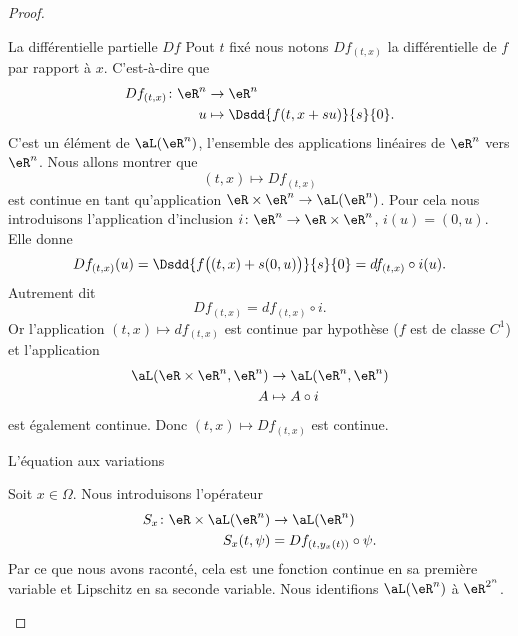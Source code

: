 \begin{proof}
	\begin{subproof}
		\item[La différentielle partielle \( Df\)]
		Pout \( t\) fixé nous notons \( Df_{(t,x)}\) la différentielle de \( f\) par rapport à \( x\). C'est-à-dire que
		\begin{equation}
			\begin{aligned}
				Df_{(t,x)}\colon \eR^n & \to \eR^n                         \\
				u                      & \mapsto \Dsdd{ f(t,x+su) }{s}{0}.
			\end{aligned}
		\end{equation}
		C'est un élément de \( \aL(\eR^n)\), l'ensemble des applications linéaires de \( \eR^n\) vers \( \eR^n\). Nous allons montrer que
		\begin{equation}
			(t,x)\mapsto Df_{(t,x)}
		\end{equation}
		est continue en tant qu'application \( \eR\times \eR^n\to\aL(\eR^n)\). Pour cela nous introduisons l'application d'inclusion \( i\colon \eR^n\to \eR\times \eR^n\), \( i(u)=(0,u)\). Elle donne
		\begin{equation}
			Df_{(t,x)}(u)=\Dsdd{ f\big( (t,x)+s(0,u) \big) }{s}{0}=df_{(t,x)}\circ i (u).
		\end{equation}
		Autrement dit
		\begin{equation}
			Df_{(t,x)}=df_{(t,x)}\circ i.
		\end{equation}
		Or l'application \( (t,x)\mapsto df_{(t,x)} \) est continue par hypothèse (\( f\) est de classe \( C^1\)) et l'application
		\begin{equation}        \label{EQooZTAPooCduWcl}
			\begin{aligned}
				\aL(\eR\times \eR^n,\eR^n) & \to \aL(\eR^n,\eR^n) \\
				A                          & \mapsto A\circ i
			\end{aligned}
		\end{equation}
		est également continue. Donc \( (t,x)\mapsto Df_{(t,x)}\) est continue.

		\item[L'équation aux variations]

		Soit \( x\in \Omega\). Nous introduisons l'opérateur
		\begin{equation}
			\begin{aligned}
				S_x\colon \eR\times \aL(\eR^n) & \to \aL(\eR^n)              \\
				S_x(t,\psi)                    & =Df_{(t,y_x(t))}\circ \psi.
			\end{aligned}
		\end{equation}
		Par ce que nous avons raconté, cela est une fonction continue en sa première variable et Lipschitz en sa seconde variable. Nous identifions \( \aL(\eR^n)\) à \( \eR^{2^n}\).


\end{subproof}
\end{proof}
